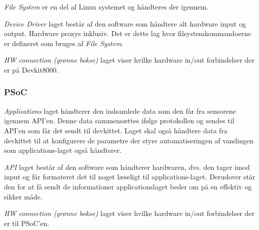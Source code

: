 \textit{File System} er en del af Linux systemet og håndteres der igennem.

\textit{Device Driver} laget består af den software som håndtere alt hardware input og output. Hardware proxys inklusiv. Det er dette lag hvor filsystemkommandoerne er defineret som bruges af \textit{File System}.

\textit{HW connection (grønne bokse)} laget viser hvilke hardware in/out forbindelser der er på Devkit8000.

\subsubsection{PSoC}

\textit{Applications} laget håndterer den indsamlede data som den får fra sensorene igennem API'en. Denne data sammensættes ifølge protokollen og sendes til API'en som får det sendt til devkittet. Laget skal også håndtere data fra devkittet til at konfigurere de parametre der styre automatiseringen af vandingen som applications-laget også håndterer.

\textit{API} laget består af den software som håndterer hardwaren, dvs. den tager imod input og får formateret det til noget læseligt til applications-laget. Derudover står den for at få sendt de informationer applicationslaget beder om på en effektiv og sikker måde.

\textit{HW connection (grønne bokse)} laget viser hvilke hardware in/out forbindelser der er til PSoC'en.